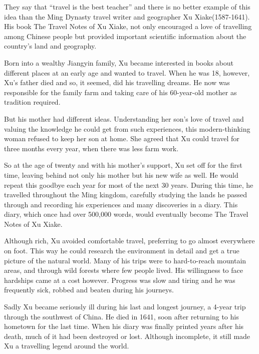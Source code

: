 \documentclass{ExamJHSEngl}
\begin{document}

They say that “travel is the best teacher” and there is no better example of this idea than the Ming Dynasty travel writer and geographer Xu Xiake(1587-1641). His book The Travel Notes of Xu Xiake, not only encouraged a love of travelling among Chinese people but provided important scientific information about the country's land and geography.

Born into a wealthy Jiangyin family, Xu became interested in books about different places at an early age and wanted to travel. When he was 18, however, Xu's father died and so, it seemed, did his travelling dreams. He now was responsible for the family farm and taking care of his 60-year-old mother as tradition required.

But his mother had different ideas. Understanding her son's love of travel and valuing the knowledge he could get from such experiences, this modern-thinking woman refused to keep her son at home. She agreed that Xu could travel for three months every year, when there was less farm work.

So at the age of twenty and with his mother's support, Xu set off for the first time, leaving behind not only his mother but his new wife as well. He would repeat this goodbye each year for most of the next 30 years. During this time, he travelled throughout the Ming kingdom, carefully studying the lands he passed through and recording his experiences and many discoveries in a diary. This diary, which once had over 500,000 words, would eventually become The Travel Notes of Xu Xiake.

Although rich, Xu avoided comfortable travel, preferring to go almost everywhere on foot. This way he could research the environment in detail and get a true picture of the natural world. Many of his trips were to hard-to-reach mountain areas, and through wild forests where few people lived. His willingness to face hardships came at a cost however. Progress was slow and tiring and he was frequently sick, robbed and beaten during his journeys.

Sadly Xu became seriously ill during his last and longest journey, a 4-year trip through the southwest of China. He died in 1641, soon after returning to his hometown for the last time. When his diary was finally printed years after his death, much of it had been destroyed or lost. Although incomplete, it still made Xu a travelling legend around the world.
\end{document}
